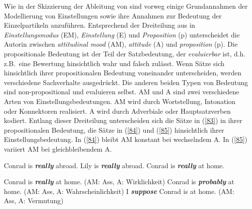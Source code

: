 Wie in der Skizzierung der Ableitung von \citet{Doherty1985} sind vorweg einige Grundannahmen der Modellierung von Einstellungen sowie ihre Annahmen zur Bedeutung der Einzelpartikeln anzuführen. Entsprechend der Dreiteilung aus \citet{Doherty1985} in \textit{Einstellungsmodus} (EM), \textit{Einstellung} (E) und \textit{Proposition} (p) unterscheidet die Autorin zwischen \textit{attitudinal mood} (AM), \textit{attitude} (A) und \textit{proposition} (p). Die propositionale Bedeutung ist der Teil der Satzbedeutung, der \textit{evaluierbar} ist, d.h. z.B.\ eine Bewertung hinsichtlich wahr und falsch zulässt. Wenn Sätze sich hinsichtlich ihrer propositionalen Bedeutung voneinander unterscheiden, werden verschiedene Sachverhalte ausgedrückt. Die anderen beiden Typen von Bedeutung sind non-propositional und evaluieren selbst. AM und A sind zwei verschiedene Arten von Einstellungsbedeutungen. AM wird durch Wortstellung, Intonation oder Konnektoren realisiert. A wird durch Adverbiale oder Hauptsatzverben kodiert. Entlang dieser Dreiteilung unterscheiden sich die Sätze in (\ref{83}) in ihrer propositionalen Bedeutung, die Sätze in (\ref{84}) und (\ref{85}) hinsichtlich ihrer Einstellungsbedeutung. In (\ref{84}) bleibt AM konstant bei wechselndem A. In (\ref{85}) variiert AM bei gleichbleibendem A.

\begin{exe}
	\ex\label{83} 
		\begin{xlist}	
			\ex\label{83a} Conrad is \textbf{\textit{really}} abroad.
			\ex\label{83b} Lily is \textbf{\textit{really}} abroad.
			\ex\label{83c} Conrad is \textbf{\textit{really}} at home.
		\end{xlist}
\end{exe}

\begin{exe}
	\ex\label{84} 
		\begin{xlist}	
			\ex\label{84a} Conrad is \textbf{\textit{really}} at home. (AM: Ass, A: Wirklichkeit)
			\ex\label{84b} Conrad is \textbf{\textit{probably}} at home. (AM: Ass, A: Wahrscheinlichkeit)
			\ex\label{84c} I \textbf{\textit{suppose}} Conrad is at home. (AM: Ass, A: Vermutung)
		\end{xlist}
\end{exe}


